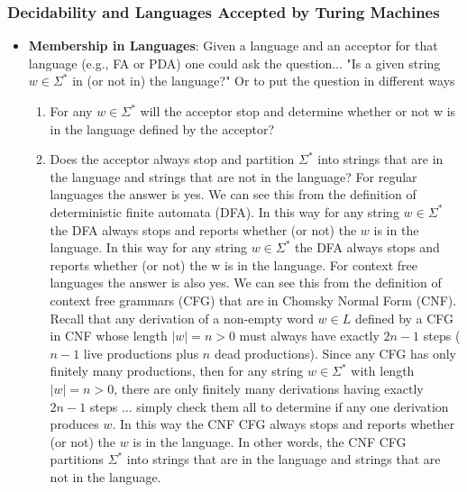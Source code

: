 \documentclass{report}
\begin{document}
    \subsubsection{Decidability and Languages Accepted by Turing Machines}
    \begin{itemize}
        \item \textbf{Membership in Languages}: Given a language and an acceptor for that language (e.g., FA or PDA) one could ask the question... "Is a given string $w\in \Sigma^{*} $ in (or not in) the language?"
            \bigbreak \noindent 
            Or to put the question in different ways
            \begin{enumerate}
                \item For any $w \in \Sigma^{*}$ will the acceptor stop and determine whether or not w is in the language defined by the acceptor? 
                \item Does the acceptor always stop and partition $\Sigma^{*} $ into strings that are in the language and strings that are not in the language? For regular languages the answer is yes. We can see this from the definition of deterministic finite automata (DFA). 
                    \bigbreak \noindent 
                    In this way for any string $w\in \Sigma^{*}$ the DFA always stops and reports whether (or not) the $w$ is in the language.
                    \bigbreak \noindent 
                    In this way for any string $w\in \Sigma^{*}$ the DFA always stops and reports whether (or not) the w is in the language.
                    \bigbreak \noindent 
                    For context free languages the answer is also yes. We can see this from the definition of context free grammars (CFG) that are in Chomsky Normal Form (CNF).
                    \bigbreak \noindent 
                    Recall that any derivation of a non-empty word $w \in L$ defined by a CFG in CNF whose length $|w| = n > 0$ must always have exactly $2n-1$ steps ($n-1$ live productions plus $n$ dead productions).
                    Since any CFG has only finitely many productions, then for any string $w \in \Sigma^*$ with length $|w| = n > 0$, there are only finitely many derivations having exactly $2n-1$ steps $\ldots$ simply check them all to determine if any one derivation produces $w$.
                    \bigbreak \noindent 
                    In this way the CNF CFG always stops and reports whether (or not) the $w$ is in the language.
                    \bigbreak \noindent 
                    In other words, the CNF CFG partitions $\Sigma^*$ into strings that are in the language and strings that are not in the language.

\end{enumerate}
\end{itemize}
\end{document}
